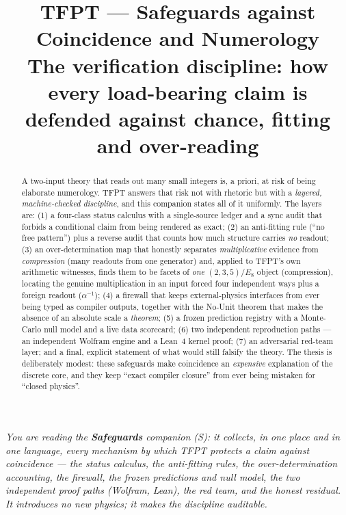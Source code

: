 \documentclass[11pt,a4paper]{article}
\title{\vspace{-1.2cm}\textbf{TFPT --- Safeguards against Coincidence and Numerology}\\[2mm]
\large The verification discipline: how every load-bearing claim is defended against chance,
fitting and over-reading}
\author{\TFPTauthors}\date{\TFPTdatestamp}
\begin{document}
\maketitle


\noindent\emph{You are reading the \textbf{Safeguards} companion (S): it collects, in one place and in
one language, every mechanism by which TFPT protects a claim against coincidence --- the status
calculus, the anti-fitting rules, the over-determination accounting, the firewall, the frozen
predictions and null model, the two independent proof paths (Wolfram, Lean), the red team, and the
honest residual. It introduces no new physics; it makes the discipline auditable.}

\begin{abstract}
\noindent A two-input theory that reads out many small integers is, a priori, at risk of being
elaborate numerology. TFPT answers that risk not with rhetoric but with a \emph{layered, machine-checked
discipline}, and this companion states all of it uniformly. The layers are: (1) a four-class status
calculus with a single-source ledger and a sync audit that forbids a conditional claim from being
rendered as exact; (2) an anti-fitting rule (``no free pattern'') plus a reverse audit that counts how
much structure carries \emph{no} readout; (3) an over-determination map that honestly separates
\emph{multiplicative} evidence from \emph{compression} (many readouts from one generator) and, applied to
TFPT's own arithmetic witnesses, finds them to be facets of \emph{one} $(2,3,5)/E_8$ object (compression),
locating the genuine multiplication in an input forced four independent ways plus a foreign readout
($\alpha^{-1}$); (4) a firewall that keeps external-physics interfaces from ever
being typed as compiler outputs, together with the No-Unit theorem that makes the absence of an absolute
scale a \emph{theorem}; (5) a frozen prediction registry with a Monte-Carlo null model and a live data
scorecard; (6) two independent reproduction paths --- an independent Wolfram engine and a Lean~4 kernel
proof; (7) an adversarial red-team layer; and a final, explicit statement of what would still falsify the
theory. The thesis is deliberately modest: these safeguards make coincidence an \emph{expensive}
explanation of the discrete core, and they keep ``exact compiler closure'' from ever being mistaken for
``closed physics''.
\end{abstract}
\end{document}
